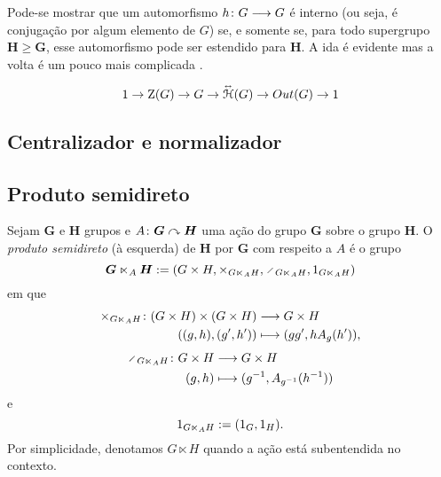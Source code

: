 Pode-se mostrar que um automorfismo ${h}\colon {G} \longrightarrow {G}$ é interno (ou seja, é conjugação por algum elemento de $G$) se, e somente se, para todo supergrupo $\bm H \geq \bm G$, esse automorfismo pode ser estendido para $\bm H$. A ida é evidente mas a volta é um pouco mais complicada \cite{art:Schupp-CharacterizationInnerAutomorphisms}.

	\begin{equation*}
	1 \to \operatorname{Z}(G) \to G \to \accentset{\leftrightarrow}{\mathcal{H}}(G) \to Out(G) \to 1
	\end{equation*}


\subsection{Centralizador e normalizador}






\subsection{Produto semidireto}

\begin{definition}
Sejam $\bm G$ e $\bm H$ grupos e $A\colon \bm G \curvearrowright \bm H$ uma ação do grupo $\bm G$ sobre o grupo $\bm H$. O \emph{produto semidireto} (à esquerda) de $\bm H$ por $\bm G$ com respeito a $A$ é o grupo
	\begin{equation*}
		\bm G \ltimes_A \bm H := (G \times H,\times_{G \ltimes_A H},\div_{G \ltimes_A H},\id_{G \ltimes_A H})
	\end{equation*}
em que
	\begin{align*}
		{\times_{G \ltimes_A H}}\colon {(G \times H) \times (G \times H)} &\longrightarrow {G \times H} \\{((g,h),(g',h'))} &\longmapsto (gg',hA_g(h')),
	\end{align*}
	\begin{align*}
		\func{\div_{G \ltimes_A H}}{G \times H}{G \times H}{(g,h)}{(g\inv,A_{g\inv}(h\inv))}
	\end{align*}
e
	\begin{equation*}
		1_{G \ltimes_A H} := (1_G,1_H).
	\end{equation*}
Por simplicidade, denotamos $G \ltimes H$ quando a ação está subentendida no contexto.

\end{definition}

